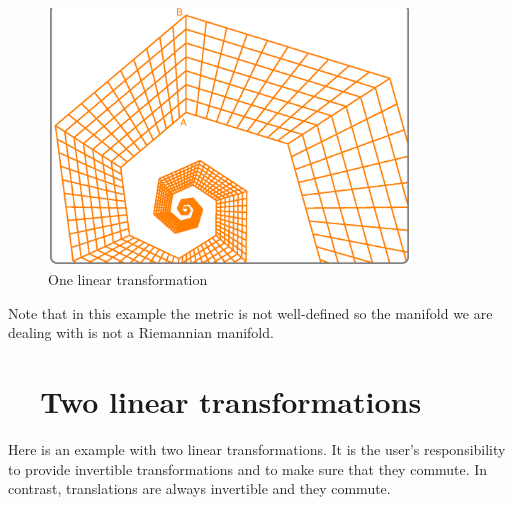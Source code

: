 \begin{figure}[ht] \centering
  \includegraphics[width=96mm]{sector-2.eps}
  \caption{One linear transformation}
  \label{\numb section 7.\numb fig 10}
\end{figure}

Note that in this example the metric is not well-defined
so the manifold we are dealing with is not a Riemannian manifold.


\section{~~Two linear transformations}\label{\numb section 7.\numb parag 15}

Here is an example with two linear transformations.
It is the user's responsibility to provide invertible transformations and
to make sure that they commute.
In contrast, translations are always invertible and they commute.

